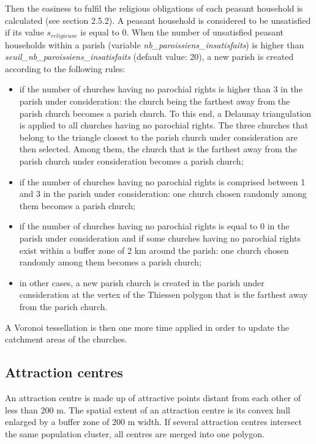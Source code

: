 \documentclass[a4paper,11pt]{article}
\begin{document}
{\begin{sloppypar}
Then the easiness to fulfil the religious obligations of each peasant household is calculated (see section 2.5.2). A peasant household is considered to be unsatisfied if its value $s_{religieuse}$ is equal to $0$. When the number of unsatisfied peasant households within a parish (variable \textit{nb\_paroissiens\_insatisfaits}) is higher than \textit{seuil\_nb\_paroissiens\_insatisfaits} (default value: 20), a new parish is created according to the following rules:
	\begin{itemize}
\item if the number of churches having no parochial rights is higher than 3 in the parish under consideration: the church being the farthest away from the parish church becomes a parish church. To this end, a Delaunay triangulation is applied to all churches having no parochial rights. The three churches that belong to the triangle closest to the parish church under consideration are then selected.  Among them, the church that is the farthest away from the parish church under consideration becomes a parish church;
\item if the number of churches having no parochial rights is comprised between 1 and 3 in the parish under consideration: one church chosen randomly among them becomes a parish church;
\item if the number of churches having no parochial rights is equal to 0 in the parish under consideration and if some churches having no parochial rights exist within a buffer zone of 2 km around the parish: one church chosen randomly among them becomes a parish church;
\item in other cases, a new parish church is created in the parish under consideration at the vertex of the Thiessen polygon that is the farthest away from the parich church.
	\end{itemize}
	
A Voronoi tessellation is then one more time applied in order to update the catchment areas of the churches.
\end{sloppypar}


\subsection{Attraction centres}

An attraction centre is made up of attractive points distant from each other of less than 200 m. The spatial extent of an attraction centre is its convex hull enlarged by a buffer zone of 200 m width. If several attraction centres intersect the same population cluster, all centres are merged into one polygon.

}
\end{document}
